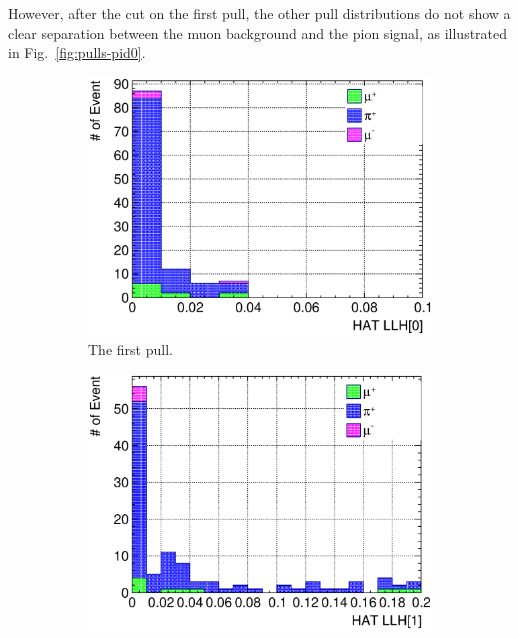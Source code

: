           However, after the cut on the first pull, the other pull distributions do not show a clear separation between the muon background and the pion signal, as illustrated in Fig.~\ref{fig:pulls-pid0}.
          \begin{figure}
               \centering
               \begin{subfigure}{\dbfigwid\textwidth}
                    \includegraphics[width=\textwidth]{figures/sel/sspi_TOP_hat_pid0_stack_al5_pid0.eps}
                    \caption{The first pull.}
                    \label{subfig:sppi-pulls-1-pid0}
               \end{subfigure}
               \begin{subfigure}{\dbfigwid\textwidth}
                    \includegraphics[width=\textwidth]{figures/sel/sspi_TOP_hat_pid1_stack_al5_pid0.eps}

\end{subfigure}
\end{figure}
